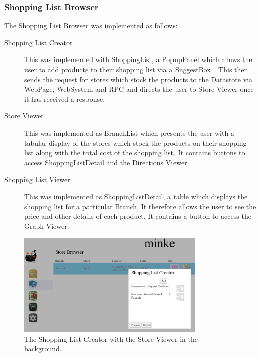\subsubsection{Shopping List Browser}
The Shopping List Browser was implemented as follows:
\begin{description}
\item[Shopping List Creator] This was implemented with ShoppingList, a
PopupPanel which allows the user to add products to their shopping list via a
SuggestBox~\cite{suggest}. This then sends the request for stores which stock
the products to the Datastore via WebPage, WebSystem and RPC and directs the
user to Store Viewer once it has received a response.
\item[Store Viewer] This was implemented as BranchList which presents the user
with a tabular display of the stores which stock the products on their shopping
list along with the total cost of the shopping list. It contains buttons to access
 ShoppingListDetail and the Directions Viewer.
\item[Shopping List Viewer] This was implemented as ShoppingListDetail, a table
which displays the shopping list for a particular Branch. It therefore allows
the user to see the price and other details of each product.
It contains a button to access the Graph Viewer.
\end{description}
\begin{figure}[h!]
\centering
\includegraphics[width=0.8\textwidth]{gwt-list.png}
\caption{The Shopping List Creator with the Store Viewer in the background.}
\end{figure}